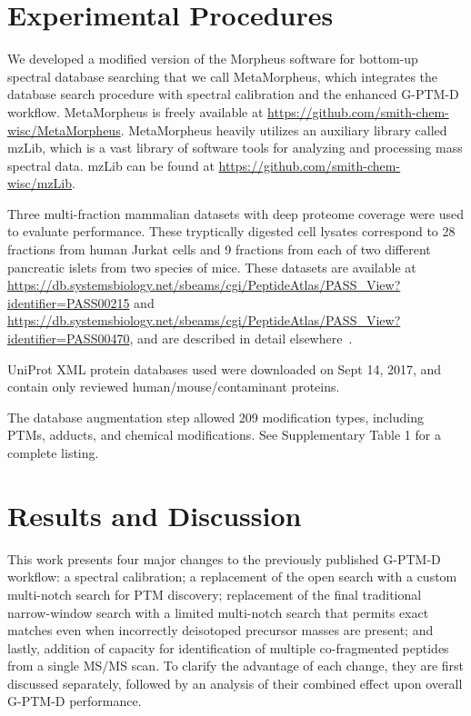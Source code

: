 \documentclass[journal=jprobs,manuscript=article]{achemso}
\begin{document}
\section{Experimental Procedures}

We developed a modified version of the Morpheus software for bottom-up spectral database searching\citep{Wenger_2013} that we call MetaMorpheus, which integrates the database search procedure with spectral calibration and the enhanced G-PTM-D workflow.
MetaMorpheus is freely available at \url{https://github.com/smith-chem-wisc/MetaMorpheus}.
MetaMorpheus heavily utilizes an auxiliary library called mzLib, which is a vast library of software tools for analyzing and processing mass spectral data.
mzLib can be found at \url{https://github.com/smith-chem-wisc/mzLib}.

Three multi-fraction mammalian datasets with deep proteome coverage were used to evaluate performance.
These tryptically digested cell lysates correspond to 28 fractions from human Jurkat cells and 9 fractions from each of two different pancreatic islets from two species of mice.
These datasets are available at \url{https://db.systemsbiology.net/sbeams/cgi/PeptideAtlas/PASS_View?identifier=PASS00215} and \url{https://db.systemsbiology.net/sbeams/cgi/PeptideAtlas/PASS_View?identifier=PASS00470}, and are described in detail elsewhere~\citep{Sheynkman2013, Shortreed_2015, Cesnik_2016}.

UniProt XML protein databases used were downloaded on Sept 14, 2017, and contain only reviewed human/mouse/contaminant proteins.

The database augmentation step allowed 209 modification types, including PTMs, adducts, and chemical modifications. See Supplementary Table 1 for a complete listing.

\section{Results and Discussion}

This work presents four major changes to the previously published G-PTM-D workflow:
a spectral calibration;
a replacement of the open search with a custom multi-notch search for PTM discovery;
replacement of the final traditional narrow-window search with a limited multi-notch search that permits exact matches even when incorrectly deisotoped precursor masses are present;
and lastly, addition of capacity for identification of multiple co-fragmented peptides from a single MS/MS scan.
To clarify the advantage of each change, they are first discussed separately, followed by an analysis of their combined effect upon overall G-PTM-D performance.
\end{document}
